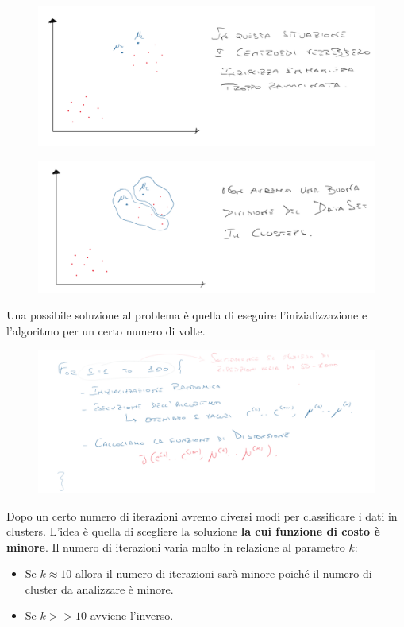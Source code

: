      \begin{figure}[H]
    \centering
    \includegraphics[width=1\textwidth]{img/kmeans9.PNG}
\end{figure}
     \begin{figure}[H]
    \centering
    \includegraphics[width=1\textwidth]{img/kmeans10.PNG}
\end{figure}
Una possibile soluzione al problema è quella di eseguire l'inizializzazione e l'algoritmo per un certo numero di volte.
     \begin{figure}[H]
    \centering
    \includegraphics[width=1\textwidth]{img/kmeans15.PNG}
\end{figure}
Dopo un certo numero di iterazioni avremo diversi modi per classificare i dati in clusters. L'idea è quella di scegliere la soluzione \textbf{la cui funzione di costo è minore}. Il numero di iterazioni varia molto in relazione al parametro $k$:
\begin{itemize}
    \item Se $k \approx 10$ allora il numero di iterazioni sarà minore poiché il numero di cluster da analizzare è minore.
    \item Se $k >> 10$ avviene l'inverso.
\end{itemize}
